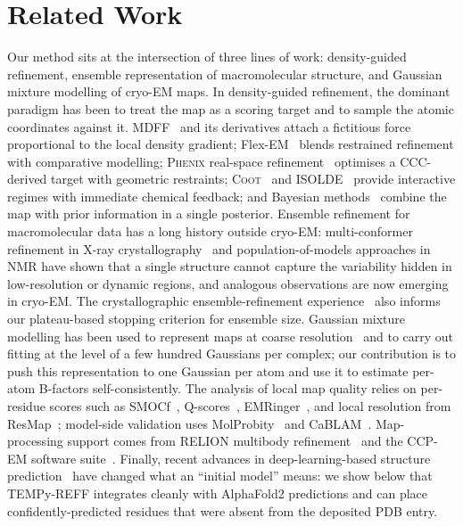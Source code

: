 \documentclass[11pt]{article}
\begin{document}
\section{Related Work}
Our method sits at the intersection of three lines of work: density-guided refinement, ensemble representation of macromolecular structure, and Gaussian mixture modelling of cryo-EM maps. In density-guided refinement, the dominant paradigm has been to treat the map as a scoring target and to sample the atomic coordinates against it. MDFF~\cite{trabuco2008} and its derivatives attach a fictitious force proportional to the local density gradient; Flex-EM~\cite{topf2008,joseph2017} blends restrained refinement with comparative modelling; \textsc{Phenix} real-space refinement~\cite{afonine2018,liebschner2019} optimises a CCC-derived target with geometric restraints; \textsc{Coot}~\cite{emsley2010} and \textsc{ISOLDE}~\cite{croll2018} provide interactive regimes with immediate chemical feedback; and Bayesian methods~\cite{bonomi2018} combine the map with prior information in a single posterior. Ensemble refinement for macromolecular data has a long history outside cryo-EM: multi-conformer refinement in X-ray crystallography~\cite{levin2007,burnley2012} and population-of-models approaches in NMR have shown that a single structure cannot capture the variability hidden in low-resolution or dynamic regions, and analogous observations are now emerging in cryo-EM. The crystallographic ensemble-refinement experience~\cite{burnley2012} also informs our plateau-based stopping criterion for ensemble size. Gaussian mixture modelling has been used to represent maps at coarse resolution~\cite{kawabata2008} and to carry out fitting at the level of a few hundred Gaussians per complex; our contribution is to push this representation to one Gaussian per atom and use it to estimate per-atom B-factors self-consistently. The analysis of local map quality relies on per-residue scores such as SMOCf~\cite{farabella2015,joseph2017}, Q-scores~\cite{pintilie2020}, EMRinger~\cite{barad2015}, and local resolution from ResMap~\cite{kucukelbir2014}; model-side validation uses MolProbity~\cite{williams2018,chen2010} and CaBLAM~\cite{williams2018}. Map-processing support comes from RELION multibody refinement~\cite{nakane2018,scheres2012} and the CCP-EM software suite~\cite{burnley2017,joseph2020}. Finally, recent advances in deep-learning-based structure prediction~\cite{jumper2021,baek2021} have changed what an ``initial model'' means: we show below that TEMPy-REFF integrates cleanly with AlphaFold2 predictions and can place confidently-predicted residues that were absent from the deposited PDB entry.
\end{document}
